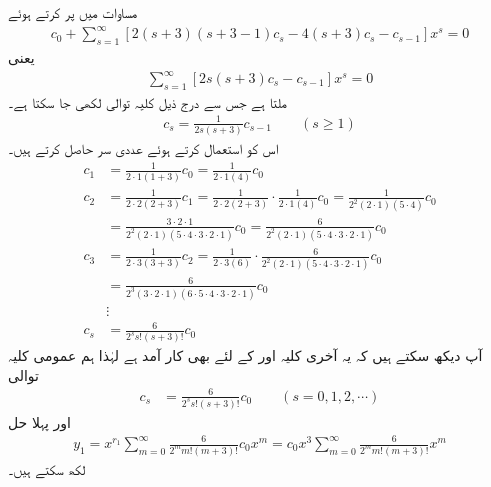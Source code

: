 مساوات  میں  پر کرتے ہوئے
 \begin{align*}
[2\cdot 3(3-1)-4\cdot 3]c_0+\sum_{s=1}^{\infty}[2 (s+3)(s+3-1)c_s-4(s+3)c_s-c_{s-1}]x^{s}=0
\end{align*}
یعنی
 \begin{align*}
\sum_{s=1}^{\infty}[2s(s+3)c_s-c_{s-1}]x^{s}=0
\end{align*}
ملتا ہے جس سے درج ذیل کلیہ توالی لکھی جا سکتا ہے۔
\begin{align*}
c_s=\frac{1}{2s(s+3)}c_{s-1}\quad \quad (s\ge 1)
\end{align*}
اس کو استعمال کرتے ہوئے عددی سر حاصل کرتے ہیں۔
\begin{align*}
c_1&=\frac{1}{2\cdot 1(1+3)}c_0=\frac{1}{2\cdot 1 (4)}c_0\\
c_2&=\frac{1}{2\cdot 2(2+3)}c_1=\frac{1}{2\cdot 2(2+3)}\cdot \frac{1}{2\cdot 1 (4)}c_0=\frac{1}{2^2(2\cdot 1)(5\cdot 4)}c_0\\
&=\frac{3\cdot 2\cdot 1}{2^2(2\cdot 1)(5\cdot 4\cdot 3\cdot 2\cdot 1)}c_0=\frac{6}{2^2(2\cdot 1)(5\cdot 4\cdot 3\cdot 2\cdot 1)}c_0\\
c_3&=\frac{1}{2\cdot 3(3+3)}c_2=\frac{1}{2\cdot 3(6)}\cdot \frac{6}{2^2(2\cdot 1)(5\cdot 4\cdot 3\cdot 2\cdot 1)}c_0\\
&=\frac{6}{2^3(3\cdot 2\cdot 1)(6\cdot 5\cdot 4\cdot 3\cdot 2\cdot 1)}c_0\\
&\vdots\\
c_s&=\frac{6}{2^s s!(s+3)!}c_0
\end{align*}
آپ دیکھ سکتے ہیں کہ یہ آخری کلیہ  اور  کے لئے بھی کار آمد ہے لہٰذا ہم عمومی کلیہ توالی
\begin{align*}
c_s&=\frac{6}{2^s s!(s+3)!}c_0\quad \quad (s=0,1,2,\cdots)
\end{align*}
اور پہلا حل
\begin{align*}
y_1=x^{r_1}\sum_{m=0}^{\infty}\frac{6}{2^m m!(m+3)!}c_0x^m=c_0x^3\sum_{m=0}^{\infty}\frac{6}{2^m m!(m+3)!}x^m
\end{align*}
لکھ سکتے ہیں۔

